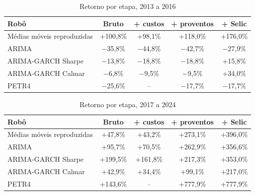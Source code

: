 \begin{table}[htbp]
\centering
\caption{Retorno por etapa, 2013 a 2016}
\label{tab:camadas-t2}
\fontsize{10}{12}\selectfont
\begin{tabular}{l|c|c|c|c}
\hline
Robô & Bruto & + custos & + proventos & + Selic \\
\hline
Médias móveis reproduzidas & +100,8\% & +98,1\% & +118,0\% & +176,0\% \\
\hline
ARIMA & $-$35,8\% & $-$44,8\% & $-$42,7\% & $-$27,9\% \\
\hline
ARIMA-GARCH Sharpe & $-$13,8\% & $-$18,8\% & $-$18,8\% & +15,8\% \\
\hline
ARIMA-GARCH Calmar & $-$6,8\% & $-$9,5\% & $-$9,5\% & +34,0\% \\
\hline
PETR4 & $-$25,6\% & -- & $-$17,7\% & $-$17,7\% \\
\hline
\end{tabular}
\end{table}

\begin{table}[htbp]
\centering
\caption{Retorno por etapa, 2017 a 2024}
\label{tab:camadas-r6}
\fontsize{10}{12}\selectfont
\begin{tabular}{l|c|c|c|c}
\hline
Robô & Bruto & + custos & + proventos & + Selic \\
\hline
Médias móveis reproduzidas & +47,8\% & +43,2\% & +273,1\% & +396,0\% \\
\hline
ARIMA & +95,7\% & +70,5\% & +262,9\% & +356,6\% \\
\hline
ARIMA-GARCH Sharpe & +199,5\% & +161,8\% & +217,3\% & +353,0\% \\
\hline
ARIMA-GARCH Calmar & +42,9\% & +34,4\% & +99,1\% & +217,0\% \\
\hline
PETR4 & +143,6\% & -- & +777,9\% & +777,9\% \\
\hline
\end{tabular}
\end{table}

